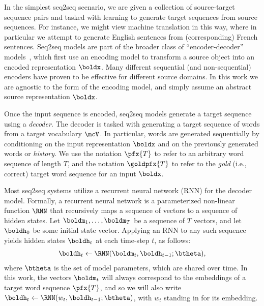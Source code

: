 In the simplest seq2seq scenario, we are given a collection of source-target
sequence pairs and tasked with learning to generate
target sequences from source sequences. For instance, we might view machine translation in this way, where in particular we attempt to generate English sentences from (corresponding) French sentences. Seq2seq models are part of the broader class of ``encoder-decoder'' models~\cite{cho14on}, which first use an encoding model to transform a source object into an encoded representation $\boldx$. Many different sequential
(and non-sequential) encoders have proven to be effective for
different source domains. In this work we are agnostic to the
form of the encoding model, and simply assume an abstract source
representation $\boldx$. %

Once the input sequence is encoded, seq2seq models generate a target
sequence using a \textit{decoder}. The decoder is tasked with
generating a target sequence of words from a target vocabulary $\mcV$. In particular, words are generated sequentially by conditioning on the input representation $\boldx$ and on the previously generated words or \textit{history}. We use the notation $\pfx{T}$ to refer to an arbitrary word sequence of length $T$, and the notation $\goldpfx{T}$ to refer to the \textit{gold} (i.e., correct) target word sequence for an input $\boldx$. 

Most seq2seq systems utilize a recurrent neural network (RNN) for the decoder model. Formally, a recurrent neural network is a parameterized non-linear
function $\RNN$ that recursively maps a sequence of vectors to a
sequence of hidden states. Let $\boldm_1, \ldots, \boldm_T$ be a
sequence of $T$ vectors, and let $\boldh_0$ be some initial state
vector. Applying an RNN to any such sequence yields hidden states
$\boldh_t$ at each time-step $t$, as follows:
\begin{align*}
\boldh_t \gets \RNN(\boldm_t, \boldh_{t-1}; \btheta),
\end{align*}
where $\btheta$ is the set of model parameters, which are shared over time. In this work, the vectors $\boldm_t$ will always correspond to the embeddings of a target word sequence $\pfx{T}$, and so we will also write $\boldh_t \gets \RNN(w_t, \boldh_{t-1}; \btheta)$, with $w_t$ standing in for its embedding.
 
